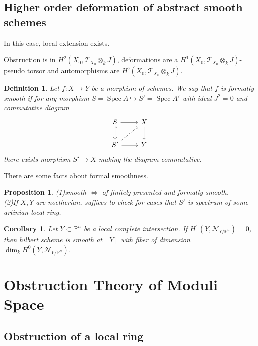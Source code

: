 \documentclass{ctexart}
\newtheorem{definition}{Definition}[section]
\newtheorem{proposition}{Proposition}[section]
\newtheorem{corollary}{Corollary}[section]
\newcommand{\spec}{\operatorname{Spec}}
\begin{document}
\subsection{Higher order deformation of abstract smooth schemes}
\label{subsection:Obstruction_Theory_higher_order_deformation_of_abstract_smooth_schemes}

In this case, local extension exists.
\par
Obstruction is in $H^{2}(X_{0}, \mathcal{T}_{X_{0}} \otimes_{k} J)$, 
deformations are a $H^{1}(X_{0}, \mathcal{T}_{X_{0}} \otimes_{k} J)$-pseudo torsor and automorphisms are $H^{0}(X_{0}, \mathcal{T}_{X_{0}} \otimes_{k} J)$.
\begin{definition}
    Let $f: X \rightarrow Y$ be a morphism of schemes.
    We say that $f$ is formally smooth if for any morphism $S = \spec A \hookrightarrow S' = \spec A'$ with ideal $J^{2} = 0$ and commutative diagram
    \begin{equation}
        \begin{tikzcd}
            S \arrow[r] \arrow[d, hookrightarrow] &
            X \arrow[d] \\
            S' \arrow[ur, dashrightarrow] \arrow[r] &
            Y
        \end{tikzcd}
    \end{equation}
    there exists morphism $S' \rightarrow X$ making the diagram commutative.
\end{definition}
There are some facts about formal smoothness.
\begin{proposition}
    (1)smooth $\iff$ of finitely presented and formally smooth. \\
    (2)If $X,Y$ are noetherian, suffices to check for cases that $S'$ is spectrum of some artinian local ring.
    \label{Proposition 2.2}
\end{proposition}
\begin{corollary}
    Let $Y \subset \mathbb{P}^{n}$ be a local complete intersection.
    If $H^{1}(Y, \mathcal{N}_{Y/\mathbb{P}^{n}}) = 0$, then hilbert scheme is smooth at $[Y]$ with fiber of dimension $\dim_{k}H^{0}(Y, \mathcal{N}_{Y/\mathbb{P}^{n}})$.
\end{corollary}

\section{Obstruction Theory of Moduli Space}

\subsection{Obstruction of a local ring}
\label{subsection:Obstruction_Theory_of_Moduli_Space_Obstruction_of_a_local_ring}
\end{document}
